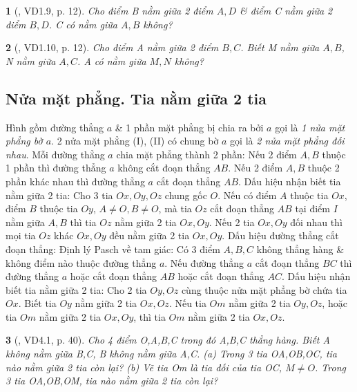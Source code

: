 \documentclass{article}
\newtheorem{baitoan}{}
\begin{document}
\begin{baitoan}[\cite{TLCT_THCS_Toan_6_hinh_hoc}, VD1.9, p. 12]
	Cho điểm B nằm giữa 2 điểm $A,D$ \& điểm C nằm giữa 2 điểm $B,D$. C có nằm giữa $A,B$ không?
\end{baitoan}

\begin{baitoan}[\cite{TLCT_THCS_Toan_6_hinh_hoc}, VD1.10, p. 12]
	Cho điểm A nằm giữa 2 điểm $B,C$. Biết M nằm giữa $A,B$, N nằm giữa $A,C$. A có nằm giữa $M,N$ không?
\end{baitoan}

\subsection{Nửa mặt phẳng. Tia nằm giữa 2 tia}
 Hình gồm đường thẳng $a$ \& 1 phần mặt phẳng bị chia ra bởi $a$ gọi là \textit{1 nửa mặt phẳng bờ $a$}. 2 nửa mặt phẳng (I), (II) có chung bờ $a$ gọi là \textit{2 nửa mặt phẳng đối nhau}.  Mỗi đường thẳng $a$ chia mặt phẳng thành 2 phần: Nếu 2 điểm $A,B$ thuộc 1 phần thì đường thẳng $a$ không cắt đoạn thẳng $AB$. Nếu 2 điểm $A,B$ thuộc 2 phần khác nhau thì đường thẳng $a$ cắt đoạn thẳng $AB$.  {\sf Dấu hiệu nhận biết tia nằm giữa 2 tia}: Cho 3 tia $Ox,Oy,Oz$ chung gốc $O$. Nếu có điểm $A$ thuộc tia $Ox$, điểm $B$ thuộc tia $Oy$, $A\ne O,B\ne O$, mà tia $Oz$ cắt đoạn thẳng $AB$ tại điểm $I$ nằm giữa $A,B$ thì tia $Oz$ nằm giữa 2 tia $Ox,Oy$.  Nếu 2 tia $Ox,Oy$ đối nhau thì mọi tia $Oz$ khác $Ox,Oy$ đều nằm giữa 2 tia $Ox,Oy$.  {\sf Dấu hiệu đường thẳng cắt đoạn thẳng}: {\sc Định lý Pasch về tam giác}: Có 3 điểm $A,B,C$ không thẳng hàng \& không điểm nào thuộc đường thẳng $a$. Nếu đường thẳng $a$ cắt đoạn thẳng $BC$ thì đường thẳng $a$ hoặc cắt đoạn thẳng $AB$ hoặc cắt đoạn thẳng $AC$.  {\sf Dấu hiệu nhận biết tia nằm giữa 2 tia}: Cho 2 tia $Oy,Oz$ cùng thuộc nửa mặt phẳng bờ chứa tia $Ox$. Biết tia $Oy$ nằm giữa 2 tia $Ox,Oz$. Nếu tia $Om$ nằm giữa 2 tia $Oy,Oz$, hoặc tia $Om$ nằm giữa 2 tia $Ox,Oy$, thì tia $Om$ nằm giữa 2 tia $Ox,Oz$.

\begin{baitoan}[\cite{TLCT_THCS_Toan_6_hinh_hoc}, VD4.1, p. 40]
	Cho 4 điểm O,A,B,C trong đó A,B,C thẳng hàng. Biết A không nằm giữa B,C, B không nằm giữa A,C. (a) Trong 3 tia OA,OB,OC, tia nào nằm giữa 2 tia còn lại? (b) Vẽ tia Om là tia đối của tia OC, $M\ne O$. Trong 3 tia OA,OB,OM, tia nào nằm giữa 2 tia còn lại?
\end{baitoan}
\end{document}
